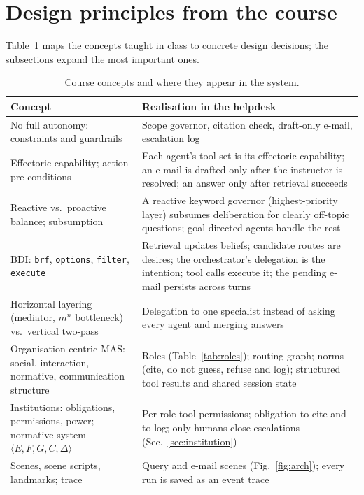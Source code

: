 \documentclass[11pt,a4paper]{article}
\begin{document}
\section{Design principles from the course}
Table~\ref{tab:principles} maps the concepts taught in class to concrete design decisions; the
subsections expand the most important ones.

\begin{table}[h]
\centering\small
\caption{Course concepts and where they appear in the system.}
\label{tab:principles}
\begin{tabular}{>{\raggedright\arraybackslash}p{5.2cm}>{\raggedright\arraybackslash}p{10.6cm}}
\toprule
Concept & Realisation in the helpdesk \\
\midrule
No full autonomy: constraints and guardrails & Scope governor, citation check, draft-only e-mail, escalation log \\
Effectoric capability; action pre-conditions & Each agent's tool set is its effectoric capability; an e-mail is drafted only after the instructor is resolved; an answer only after retrieval succeeds \\
Reactive vs.\ proactive balance; subsumption & A reactive keyword governor (highest-priority layer) subsumes deliberation for clearly off-topic questions; goal-directed agents handle the rest \\
BDI: \texttt{brf}, \texttt{options}, \texttt{filter}, \texttt{execute} & Retrieval updates beliefs; candidate routes are desires; the orchestrator's delegation is the intention; tool calls execute it; the pending e-mail persists across turns \\
Horizontal layering (mediator, $m^n$ bottleneck) vs.\ vertical two-pass & Delegation to one specialist instead of asking every agent and merging answers \\
Organisation-centric MAS: social, interaction, normative, communication structure & Roles (Table~\ref{tab:roles}); routing graph; norms (cite, do not guess, refuse and log); structured tool results and shared session state \\
Institutions: obligations, permissions, power; normative system $\langle E,F,G,C,\Delta\rangle$ & Per-role tool permissions; obligation to cite and to log; only humans close escalations (Sec.~\ref{sec:institution}) \\
Scenes, scene scripts, landmarks; trace & Query and e-mail scenes (Fig.~\ref{fig:arch}); every run is saved as an event trace \\

\end{tabular}
\end{table}
\end{document}
